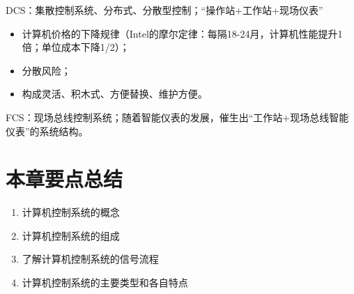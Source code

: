 DCS：集散控制系统、分布式、分散型控制；“操作站+工作站+现场仪表”

\begin{itemize}
  \item 计算机价格的下降规律（Intel的摩尔定律：每隔18-24月，计算机性能提升1倍；单位成本下降1/2）；
  \item 分散风险；
  \item 构成灵活、积木式、方便替换、维护方便。
\end{itemize}



FCS：现场总线控制系统；随着智能仪表的发展，催生出“工作站+现场总线智能仪表”的系统结构。

\section{本章要点总结}

\begin{enumerate}
  \item 计算机控制系统的概念
  \item 计算机控制系统的组成

  \item 了解计算机控制系统的信号流程
  \item 计算机控制系统的主要类型和各自特点

\end{enumerate}

